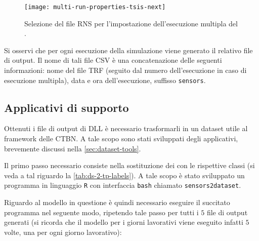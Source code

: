 \begin{figure}[ht]
	\centering
	\texttt{[image: multi-run-properties-tsis-next]}
	\caption[Esecuzione multipla guidata da file \acs{RNS}]{Selezione del file \acs{RNS} per l'impostazione dell'esecuzione multipla del .}\label{fig:multi-run-properties-tsis-next}
\end{figure}

Si osservi che per ogni esecuzione della simulazione viene generato il relativo file di output. Il nome di tali file \acs{CSV} è una concatenazione delle seguenti informazioni: nome del file \acs{TRF} (seguito dal numero dell'esecuzione in caso di esecuzione multipla), data e ora dell'esecuzione, suffisso \lstinline[]|sensors|.

\subsection{Applicativi di supporto}
Ottenuti i file di output di  \acs{DLL} è necessario trasformarli in un dataset utile al framework delle \acs{CTBN}. A tale scopo sono stati sviluppati degli applicativi, brevemente discussi nella \vref{sec:dataset-tools}.

Il primo passo necessario consiste nella sostituzione dei \emph{} con le rispettive classi (si veda a tal riguardo la \vref{tab:ds-2-tp-labels}). A tale scopo è stato sviluppato un programma in linguaggio \lstinline[]|R| con interfaccia \lstinline[]|bash| chiamato \lstinline[]|sensors2dataset|.

Riguardo al modello in questione è quindi necessario eseguire il succitato programma nel seguente modo, ripetendo tale passo per tutti i $5$ file di output generati (si ricorda che il modello per i giorni lavorativi viene eseguito infatti $5$ volte, una per ogni giorno lavorativo):

